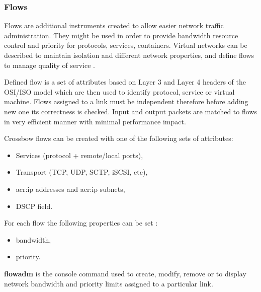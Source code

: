 \documentclass[11pt]{book}
\begin{document}
        \subsubsection{Flows}

          Flows are additional instruments created to allow easier network traffic administration. They might be used in
          order to provide bandwidth resource control and priority for protocols, services, containers. Virtual
          networks can be described to maintain isolation and different network properties, and define flows to manage quality
          of service \cite{network_virtualization}.

          Defined flow is a set of attributes based on Layer 3 and Layer 4 headers of the OSI/ISO model which are then
          used to identify protocol, service or virtual machine.  Flows assigned to a link must be independent therefore
          before adding new one its correctness is checked. Input and output packets are matched to flows in very
          efficient manner with minimal performance impact.

          \medskip

          Crossbow flows can be created with one of the following sets of attributes:

          \begin{itemize}
            \item Services (protocol + remote/local ports),
            \item Transport (TCP, UDP, SCTP, iSCSI, etc),
            \item \gls{acr:ip} addresses and \gls{acr:ip} subnets,
            \item DSCP field.
          \end{itemize}

          For each flow the following properties can be set \cite{flows2}: 

          \begin{itemize}
            \item bandwidth,
            \item priority.
          \end{itemize}

          \medskip

          

          \textbf{flowadm} is the console command used to create, modify, remove or to display network bandwidth and
          priority limits assigned to a particular link. 
\end{document}
